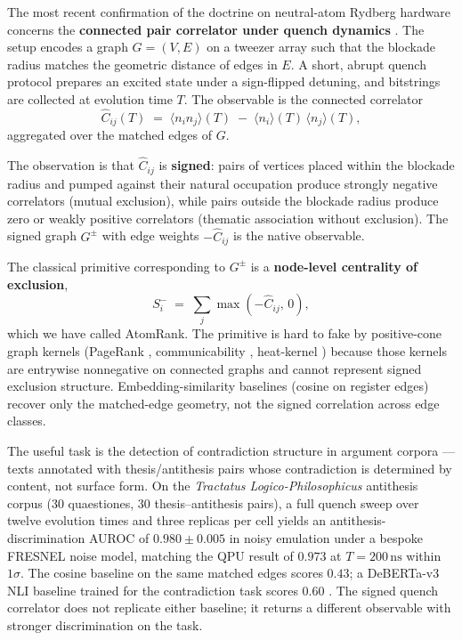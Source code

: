 \documentclass[10pt]{article}
\begin{document}
The most recent confirmation of the doctrine on neutral-atom Rydberg hardware concerns the \textbf{connected pair correlator under quench dynamics} \cite{jurczak2026atomrank}. The setup encodes a graph $G = (V, E)$ on a tweezer array such that the blockade radius matches the geometric distance of edges in $E$. A short, abrupt quench protocol prepares an excited state under a sign-flipped detuning, and bitstrings are collected at evolution time $T$. The observable is the connected correlator
\begin{equation}
\hat C_{ij}(T) \;=\; \langle n_i n_j \rangle(T) \;-\; \langle n_i\rangle(T)\,\langle n_j\rangle(T),
\label{eq:Cij}
\end{equation}
aggregated over the matched edges of $G$.

The observation is that $\hat C_{ij}$ is \textbf{signed}: pairs of vertices placed within the blockade radius and pumped against their natural occupation produce strongly negative correlators (mutual exclusion), while pairs outside the blockade radius produce zero or weakly positive correlators (thematic association without exclusion). The signed graph $G^\pm$ with edge weights $-\hat C_{ij}$ is the native observable.

The classical primitive corresponding to $G^\pm$ is a \textbf{node-level centrality of exclusion},
\begin{equation}
S_i^- \;=\; \sum_j \max(-\hat C_{ij},\, 0),
\label{eq:atomrank}
\end{equation}
which we have called AtomRank. The primitive is hard to fake by positive-cone graph kernels (PageRank \cite{brin1998pagerank}, communicability \cite{estrada2008communicability}, heat-kernel \cite{kondor2002diffusion}) because those kernels are entrywise nonnegative on connected graphs and cannot represent signed exclusion structure. Embedding-similarity baselines (cosine on register edges) recover only the matched-edge geometry, not the signed correlation across edge classes.

The useful task is the detection of contradiction structure in argument corpora --- texts annotated with thesis/antithesis pairs whose contradiction is determined by content, not surface form. On the \emph{Tractatus Logico-Philosophicus} antithesis corpus (30 quaestiones, 30 thesis--antithesis pairs), a full quench sweep over twelve evolution times and three replicas per cell yields an antithesis-discrimination AUROC of $0.980 \pm 0.005$ in noisy emulation under a bespoke FRESNEL noise model, matching the QPU result of $0.973$ at $T = 200\,\text{ns}$ within $1\sigma$. The cosine baseline on the same matched edges scores $0.43$; a DeBERTa-v3 NLI baseline trained for the contradiction task scores $0.60$ \cite{bowman2015snli}. The signed quench correlator does not replicate either baseline; it returns a different observable with stronger discrimination on the task.
\end{document}
